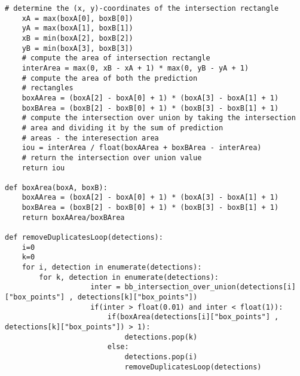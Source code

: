 \begin{lstlisting}[caption=Funções de eliminação de \textit{Bounding Boxes} sobrepostas e duplicadas]
	# determine the (x, y)-coordinates of the intersection rectangle
	xA = max(boxA[0], boxB[0])
	yA = max(boxA[1], boxB[1])
	xB = min(boxA[2], boxB[2])
	yB = min(boxA[3], boxB[3])
	# compute the area of intersection rectangle
	interArea = max(0, xB - xA + 1) * max(0, yB - yA + 1)
	# compute the area of both the prediction
	# rectangles
	boxAArea = (boxA[2] - boxA[0] + 1) * (boxA[3] - boxA[1] + 1)
	boxBArea = (boxB[2] - boxB[0] + 1) * (boxB[3] - boxB[1] + 1)
	# compute the intersection over union by taking the intersection
	# area and dividing it by the sum of prediction
	# areas - the interesection area
	iou = interArea / float(boxAArea + boxBArea - interArea)
	# return the intersection over union value
	return iou

def boxArea(boxA, boxB):
	boxAArea = (boxA[2] - boxA[0] + 1) * (boxA[3] - boxA[1] + 1)
	boxBArea = (boxB[2] - boxB[0] + 1) * (boxB[3] - boxB[1] + 1)
	return boxAArea/boxBArea

def removeDuplicatesLoop(detections):
	i=0
	k=0
	for i, detection in enumerate(detections):
		for k, detection in enumerate(detections):
					inter = bb_intersection_over_union(detections[i]["box_points"] , detections[k]["box_points"])
					if(inter > float(0.01) and inter < float(1)):
						if(boxArea(detections[i]["box_points"] , detections[k]["box_points"]) > 1):
							detections.pop(k)
						else:
							detections.pop(i)
							removeDuplicatesLoop(detections)
\end{lstlisting}

